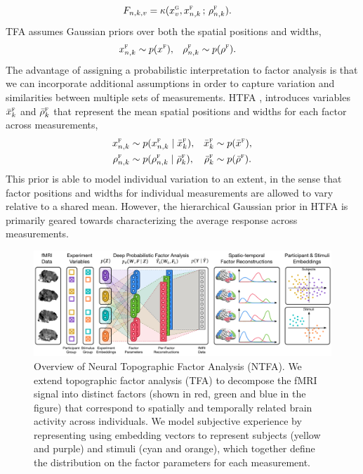 \documentclass{article}
\newcommand{\scf}{\textsc{f}}
\newcommand{\scg}{\textsc{g}}
\begin{document}
\begin{align}
	\label{eq:tfa-factor-kernel}
	F_{n,k,v}
    &= 
    \kappa(x^\scg_v, x^\scf_{n,k} \,;\, \rho^\scf_{n,k})
    .
\end{align}
TFA assumes Gaussian priors over both the spatial positions and widths, 
\begin{align}
	x^\scf_{n,k} 
    &\sim 
    p(x^\scf),
    &   
	\rho^\scf_{n,k} 
    &\sim 
    p(\rho^\scf).
\end{align}
The advantage of assigning a probabilistic interpretation to factor analysis is that we can incorporate additional assumptions in order to capture variation and similarities between multiple sets of measurements. HTFA \cite{manning2014hierarchical}, introduces variables $\bar{x}^\scf_k$ and $\bar{\rho}^\scf_k$ that represent the mean spatial positions and widths for each factor across measurements, 
\begin{align} 
    x^\scf_{n,k} 
    &\sim 
    p(x^\scf_{n,k} \mid \bar{x}^\scf_{k})
    ,
    &
    \bar{x}^\scf_{k} 
    &\sim
    p(\bar{x}^\scf)
    ,
    \\
    \rho^\scf_{n,k} 
    &\sim 
    p(\rho^\scf_{n,k} \mid \bar{\rho}^\scf_{k})
    ,
    &
    \bar{\rho}^\scf_{k} 
    &\sim
    p(\bar{\rho}^\scf).
\end{align}
This prior is able to model individual variation to an extent, in the sense that factor positions and widths for individual measurements are allowed to vary relative to a shared mean. However, the hierarchical Gaussian prior in HTFA is primarily geared towards characterizing the average response across measurements. 

\begin{figure}[!t]
    \includegraphics[width=\textwidth]{figures/deep-tfa.pdf}
    \caption{\label{fig:subject-embedding} Overview of Neural Topographic Factor Analysis (NTFA). We extend topographic factor analysis (TFA) \cite{manning2014topographic,manning2014hierarchical} to decompose the fMRI signal into distinct factors (shown in red, green and blue in the figure) that correspond to spatially and temporally related brain activity across individuals. We model subjective experience by representing using embedding vectors to represent subjects (yellow and purple) and stimuli (cyan and orange), which together define the distribution on the factor parameters for each measurement.}
\end{figure}
\end{document}

